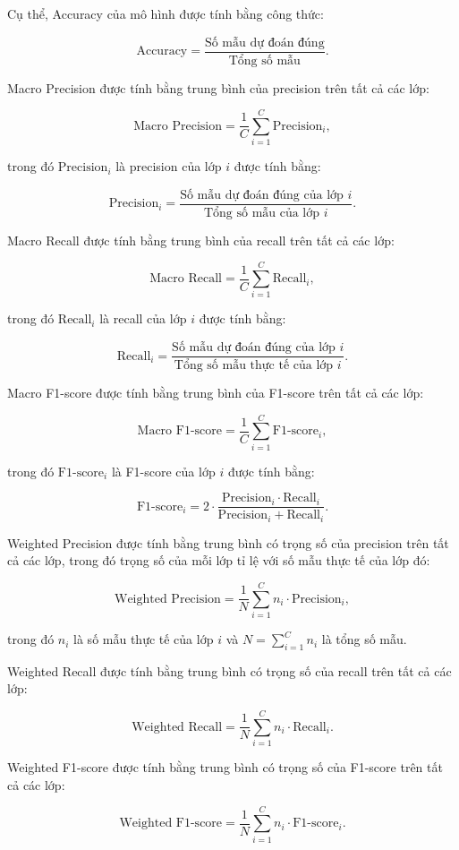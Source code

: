 Cụ thể, Accuracy của mô hình được tính bằng công thức:

\[
\text{Accuracy} = \frac{\text{Số mẫu dự đoán đúng}}{\text{Tổng số mẫu}}.
\]

Macro Precision được tính bằng trung bình của precision trên tất cả các lớp:

\[
\text{Macro Precision} = \frac{1}{C} \sum_{i=1}^{C} \text{Precision}_i,
\]

trong đó $\text{Precision}_i$ là precision của lớp $i$ được tính bằng:

\[
\text{Precision}_i = \frac{\text{Số mẫu dự đoán đúng của lớp } i}{\text{Tổng số mẫu của lớp } i}.
\]

Macro Recall được tính bằng trung bình của recall trên tất cả các lớp:

\[
\text{Macro Recall} = \frac{1}{C} \sum_{i=1}^{C} \text{Recall}_i,
\]

trong đó $\text{Recall}_i$ là recall của lớp $i$ được tính bằng:

\[
\text{Recall}_i = \frac{\text{Số mẫu dự đoán đúng của lớp } i}{\text{Tổng số mẫu thực tế của lớp } i}.
\]

Macro F1-score được tính bằng trung bình của F1-score trên tất cả các lớp:

\[
\text{Macro F1-score} = \frac{1}{C} \sum_{i=1}^{C} \text{F1-score}_i,
\]

trong đó $\text{F1-score}_i$ là F1-score của lớp $i$ được tính bằng:

\[
\text{F1-score}_i = 2 \cdot \frac{\text{Precision}_i \cdot \text{Recall}_i}{\text{Precision}_i + \text{Recall}_i}.
\]

Weighted Precision được tính bằng trung bình có trọng số của precision trên tất cả các lớp, trong đó trọng số của mỗi lớp tỉ lệ với số mẫu thực tế của lớp đó:

\[
\text{Weighted Precision} = \frac{1}{N} \sum_{i=1}^{C} n_i \cdot \text{Precision}_i,
\]

trong đó $n_i$ là số mẫu thực tế của lớp $i$ và $N = \sum_{i=1}^{C} n_i$ là tổng số mẫu.

Weighted Recall được tính bằng trung bình có trọng số của recall trên tất cả các lớp:

\[
\text{Weighted Recall} = \frac{1}{N} \sum_{i=1}^{C} n_i \cdot \text{Recall}_i.
\]

Weighted F1-score được tính bằng trung bình có trọng số của F1-score trên tất cả các lớp:

\[
\text{Weighted F1-score} = \frac{1}{N} \sum_{i=1}^{C} n_i \cdot \text{F1-score}_i.
\]

